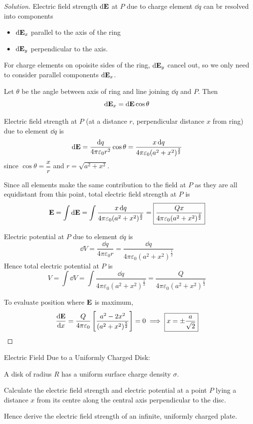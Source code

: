 \begin{proof}[Solution]
Electric field strength $\dd{\vb{E}}$ at $P$ due to charge element $\dd{q}$ can br resolved into components
\begin{itemize}
\item $\dd{\vb{E}}_x$ parallel to the axis of the ring
\item $\dd{\vb{E}}_y$ perpendicular to the axis.
\end{itemize}
For charge elements on opoisite sides of the ring, $\dd{\vb{E}}_y$ cancel out, so we only need to consider parallel components $\dd{\vb{E}}_x$.

Let $\theta$ be the angle between axis of ring and line joining $\dd{q}$ and $P$. Then
\[ \dd{\vb{E}}_x = \dd{\vb{E}}\cos\theta \]

Electric field strength at $P$ (at a distance $r$, perpendicular distance $x$ from ring) due to element $\dd{q}$ is
\[ \dd{\vb{E}} = \frac{\dd{q}}{4\pi\varepsilon_0r^2}\cos\theta = \frac{x\dd{q}}{4\pi\varepsilon_0(a^2+x^2)^\frac{3}{2}} \]
since $\cos\theta=\dfrac{x}{r}$ and $r=\sqrt{a^2+x^2}$.

Since all elements make the same contribution to the field at $P$ as they are all equidistant from this point, total electric field strength at $P$ is
\[ \vb{E} = \int \dd{\vb{E}} = \int \frac{x\dd{q}}{4\pi\varepsilon_0(a^2+x^2)^\frac{3}{2}} = \boxed{\frac{Qx}{4\pi\varepsilon_0(a^2+x^2)^\frac{3}{2}}} \]

Electric potential at $P$ due to element $\dd{q}$ is
\[ \dd{V} = \frac{\dd{q}}{4\pi\varepsilon_0r} = \frac{\dd{q}}{4\pi\varepsilon_0(a^2+x^2)^\frac{1}{2}} \]
Hence total electric potential at $P$ is
\[ V = \int\dd{V} = \int \frac{\dd{q}}{4\pi\varepsilon_0(a^2+x^2)^\frac{1}{2}} = \boxed{\frac{Q}{4\pi\varepsilon_0(a^2+x^2)^\frac{1}{2}}} \]

To evaluate position where $\vb{E}$ is maximum,
\[ \odv{\vb{E}}{x} = \frac{Q}{4\pi\epsilon_0}\sqbrac{\frac{a^2-2x^2}{(a^2+x^2)^\frac{5}{2}}} = 0 \implies \boxed{x=\pm\frac{a}{\sqrt{2}}} \]
\end{proof}
\pagebreak

Electric Field Due to a Uniformly Charged Disk:
\begin{exmp}
A disk of radius $R$ has a uniform surface charge density $\sigma$.

Calculate the electric field strength and electric potential at a point $P$ lying a distance $x$ from its centre along the central axis perpendicular to the disc.

Hence derive the electric field strength of an infinite, uniformly charged plate.
\end{exmp}

